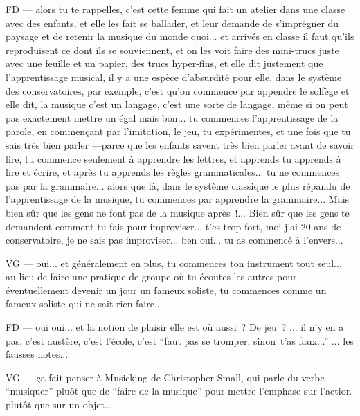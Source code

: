FD — alors tu te rappelles, c'est cette femme qui fait un atelier dans une classe avec des enfants, et elle les fait se ballader, et leur demande de s'imprégner du paysage et de retenir la musique du monde quoi... et arrivés en classe il faut qu'ils reproduisent ce dont ils se souviennent, et on les voit faire des mini-trucs juste avec une feuille et un papier, des trucs hyper-fins, et elle dit justement que l'apprentissage musical, il y a une espèce d'absurdité pour elle, dans le système des conservatoires, par exemple, c'est qu'on commence par appendre le solfège et elle dit, la musique c'est un langage, c'est une sorte de langage, même si on peut pas exactement mettre un égal mais bon... tu commences l'apprentissage de la parole, en commençant par l'imitation, le jeu, tu expérimentes, et une fois que tu sais très bien parler —parce que les enfants savent très bien parler avant de savoir lire, tu commence seulement à apprendre les lettres, et apprends tu apprends à lire et écrire, et après tu apprends les règles grammaticales... tu ne commences pas par la grammaire... alors que là, dans le système classique le plus répandu de l'apprentissage de la musique, tu commences par apprendre la grammaire... Mais bien sûr que les gens ne font pas de la musique après !... Bien sûr que les gens te demandent comment tu fais pour improviser... t'es trop fort, moi j'ai 20 ans de conservatoire, je ne sais pas improviser... ben oui... tu as commencé à l'envers... 

VG — oui... et généralement en plus, tu commences ton instrument tout seul... au lieu de faire une pratique de groupe où tu écoutes les autres pour éventuellement devenir un jour un fameux soliste, tu commences comme  un fameux soliste qui ne sait rien faire... 

FD — oui oui... et la notion de plaisir elle est où aussi ? De jeu ? ... il n'y en a pas, c'est austère, c'est l'école, c'est ``faut pas se tromper, sinon t'as faux...''  ... les fausses notes... 

VG — ça fait penser à Musicking de Christopher Small, qui parle du verbe ``musiquer'' pluôt que de ``faire de la musique'' pour mettre l'emphase sur l'action plutôt que sur un objet... 

